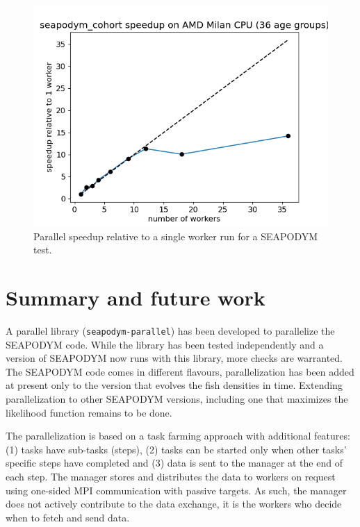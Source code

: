\documentclass[a4paper,oneside,12pt]{article}
\begin{document}
\begin{figure}
    \includegraphics[width=15cm]{results_seapodym/seapodym_cohort_speedup.png}
    \caption{Parallel speedup relative to a single worker run for a SEAPODYM test.}
    \label{fig:seapodym_scalability}
\end{figure}


\section{Summary and future work}

A parallel library (\verb|seapodym-parallel|) has been developed to parallelize the SEAPODYM code. While the library has been tested independently and a version
of SEAPODYM now runs with this library, more checks are warranted. The SEAPODYM code comes in different flavours, parallelization 
has been added at present only to the version that evolves the fish densities in time. Extending parallelization to other SEAPODYM versions, including one 
that maximizes the likelihood function remains to be done. 

The parallelization is based on a task farming approach with additional features: (1) tasks have sub-tasks (steps), (2) tasks 
can be started only when other tasks' specific steps have completed and (3) data is sent to the manager at the end of each step. The 
manager stores and distributes the data to workers on request using one-sided MPI communication with passive targets. As such,
the manager does not actively contribute to the data exchange, it is the workers who decide when to fetch and send data.
\end{document}
